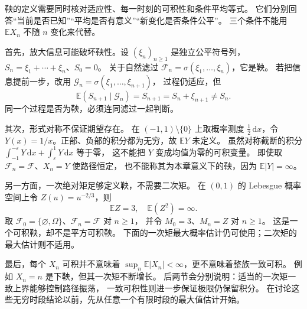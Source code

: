 鞅的定义需要同时核对适应性、每一时刻的可积性和条件平均等式。
它们分别回答“当前是否已知”“平均是否有意义”“新变化是否条件公平”。
三个条件不能用 \(\mathbb E X_n\) 不随 \(n\) 变化来代替。

\ProseParagraphBreak

首先，放大信息可能破坏鞅性。设 \((\xi_n)_{n\geq1}\) 是独立公平符号列，
\(S_n=\xi_1+\cdots+\xi_n\)、\(S_0=0\)。
关于自然滤过 \(\mathcal F_n=\sigma(\xi_1,\ldots,\xi_n)\)，它是鞅。
若把信息提前一步，改用 \(\mathcal G_n=\sigma(\xi_1,\ldots,\xi_{n+1})\)，
过程仍适应，但
\[
 \mathbb E(S_{n+1}\mid\mathcal G_n)=S_{n+1}
 =S_n+\xi_{n+1}\ne S_n.
\]
同一个过程是否为鞅，必须连同滤过一起判断。

\ProseParagraphBreak

其次，形式对称不保证期望存在。
在 \((-1,1)\setminus\{0\}\) 上取概率测度 \(\tfrac12\,\mathrm dx\)，令
\(Y(x)=1/x\)。正部、负部的积分都为无穷，故 \(\mathbb E Y\) 未定义。
虽然对称截断的积分 \(\int_{-1}^{-\varepsilon}Y\,\mathrm dx+
\int_\varepsilon^1Y\,\mathrm dx\) 等于零，
这不能把 \(Y\) 变成均值为零的可积变量。
即使取 \(\mathcal F_n=\mathcal F\)、\(X_n=Y\) 使路径恒定，
也不能称其为本章意义下的鞅，因为 \(\mathbb E|Y|=\infty\)。

\ProseParagraphBreak

另一方面，一次绝对矩足够定义鞅，不需要二次矩。
在 \((0,1)\) 的 Lebesgue 概率空间上令 \(Z(u)=u^{-2/3}\)，则
\[
 \mathbb E Z=3,\quad\mathbb E(Z^2)=\infty.
\]
取 \(\mathcal F_0=\{\varnothing,\Omega\}\)、\(\mathcal F_n=\mathcal F\) 对 \(n\geq1\)，
并令 \(M_0=3\)、\(M_n=Z\) 对 \(n\geq1\)。
这是一个可积鞅，却不是平方可积鞅。
下面的一次矩最大概率估计仍可使用；二次矩的最大估计则不适用。

\ProseParagraphBreak

最后，每个 \(X_n\) 可积并不意味着
\(\sup_n\mathbb E|X_n|<\infty\)，更不意味着整族一致可积。
例如 \(X_n=n\) 是下鞅，但其一次矩不断增长。
后两节会分别说明：适当的一次矩一致上界能够控制路径振荡，
一致可积性则进一步保证极限仍保留积分。
在讨论这些无穷时段结论以前，先从任意一个有限时段的最大值估计开始。
